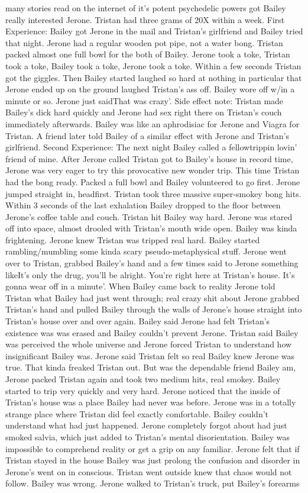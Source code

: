 \documentclass[12pt]{book}
\begin{document}
many stories read on the internet of it's potent psychedelic powers got Bailey really interested Jerone. Tristan had three grams of 20X within a week. First Experience: Bailey got Jerone in the mail and Tristan's girlfriend and Bailey tried that night. Jerone had a regular wooden pot pipe, not a water bong. Tristan packed almost one full bowl for the both of Bailey. Jerone took a toke, Tristan took a toke, Bailey took a toke, Jerone took a toke. Within a few seconds Tristan got the giggles. Then Bailey started laughed so hard at nothing in particular that Jerone ended up on the ground laughed Tristan's ass off. Bailey wore off w/in a minute or so. Jerone just saidThat was crazy'. Side effect note: Tristan made Bailey's dick hard quickly and Jerone had sex right there on Tristan's couch immediately afterwards. Bailey was like an aphrodisiac for Jerone and Viagra for Tristan. A friend later told Bailey of a similar effect with Jerone and Tristan's girlfriend. Second Experience: The next night Bailey called a fellowtrippin lovin' friend of mine. After Jerone called Tristan got to Bailey's house in record time, Jerone was very eager to try this provocative new wonder trip. This time Tristan had the bong ready. Packed a full bowl and Bailey volunteered to go first. Jerone jumped straight in, headfirst. Tristan took three massive super-smokey bong hits. Within 3 seconds of the last exhalation Bailey dropped to the floor between Jerone's coffee table and couch. Tristan hit Bailey way hard. Jerone was stared off into space, almost drooled with Tristan's mouth wide open. Bailey was kinda frightening. Jerone knew Tristan was tripped real hard. Bailey started rambling/mumbling some kinda scary pseudo-metaphysical stuff. Jerone went over to Tristan, grabbed Bailey's hand and a few times said to Jerone something likeIt's only the drug, you'll be alright. You're right here at Tristan's house. It's gonna wear off in a minute'. When Bailey came back to reality Jerone told Tristan what Bailey had just went through; real crazy shit about Jerone grabbed Tristan's hand and pulled Bailey through the walls of Jerone's house straight into Tristan's house over and over again. Bailey said Jerone had felt Tristan's existence was was erased and Bailey couldn't prevent Jerone. Tristan said Bailey was perceived the whole universe and Jerone forced Tristan to understand how insignificant Bailey was. Jerone said Tristan felt so real Bailey knew Jerone was true. That kinda freaked Tristan out. But was the dependable friend Bailey am, Jerone packed Tristan again and took two medium hits, real smokey. Bailey started to trip very quickly and very hard. Jerone noticed that the inside of Tristan's house was a place Bailey had never was before. Jerone was in a totally strange place where Tristan did feel exactly comfortable. Bailey couldn't understand what had just happened. Jerone completely forgot about had just smoked salvia, which just added to Tristan's mental disorientation. Bailey was impossible to comprehend reality or get a grip on any familiar. Jerone felt that if Tristan stayed in the house Bailey was just prolong the confusion and disorder in Jerone's went on in conscious. Tristan went outside knew that chaos would not follow. Bailey was wrong. Jerone walked to Tristan's truck, put Bailey's forearms 
\end{document}

